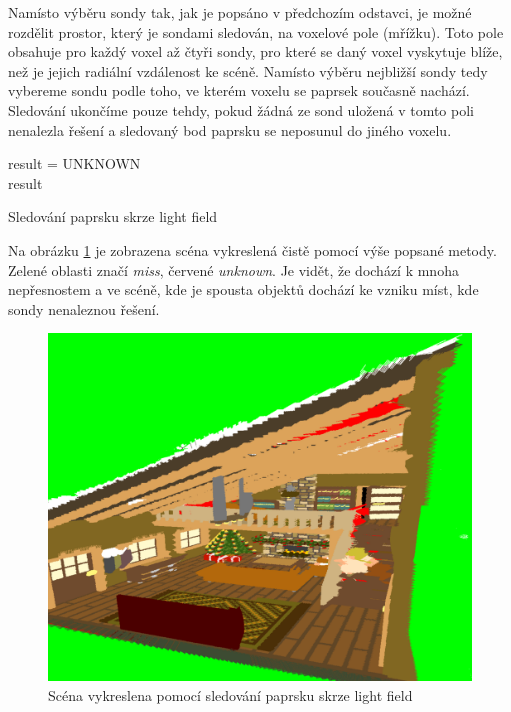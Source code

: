 Namísto výběru sondy tak, jak je popsáno v předchozím odstavci, je možné rozdělit prostor, který je sondami sledován, na voxelové pole (mřížku). Toto pole obsahuje pro každý voxel až čtyři sondy, pro které se daný voxel vyskytuje blíže, než je jejich radiální vzdálenost ke scéně. Namísto výběru nejbližší sondy tedy vybereme sondu podle toho, ve kterém voxelu se paprsek současně nachází. Sledování ukončíme pouze tehdy, pokud žádná ze sond uložená v tomto poli nenalezla řešení a sledovaný bod paprsku se neposunul do jiného voxelu. 

\begin{center}
	\begin{czechalgorithm}[H] \label{alg:light_field_trace}
	    result = UNKNOWN\\
	    \KwRet result
		\caption{Sledování paprsku skrze light field}
	\end{czechalgorithm}
\end{center}

Na obrázku \ref{fig:lfp_scene_render} je zobrazena scéna vykreslená čistě pomocí výše popsané metody. Zelené oblasti značí \textit{miss}, červené \textit{unknown}. Je vidět, že dochází k mnoha nepřesnostem a ve scéně, kde je spousta objektů dochází ke vzniku míst, kde sondy nenaleznou řešení.

\begin{figure}[H]
	\centering
	\includegraphics[scale=1]{images/probe_scene_render.png}
	\caption{Scéna vykreslena pomocí sledování paprsku skrze light field}
	\label{fig:lfp_scene_render}
\end{figure}

